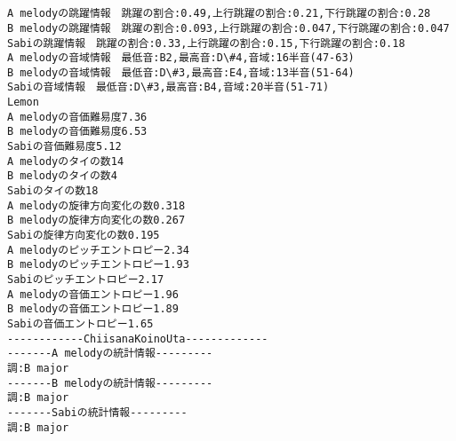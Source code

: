 \documentclass[11pt]{article}
\begin{document}
    \begin{center}
    \end{center}
    { \hspace*{\fill} \\}
    
    \begin{center}
    \end{center}
    { \hspace*{\fill} \\}
    
    \begin{Verbatim}[commandchars=\\\{\}]
A melodyの跳躍情報　跳躍の割合:0.49,上行跳躍の割合:0.21,下行跳躍の割合:0.28
B melodyの跳躍情報　跳躍の割合:0.093,上行跳躍の割合:0.047,下行跳躍の割合:0.047
Sabiの跳躍情報　跳躍の割合:0.33,上行跳躍の割合:0.15,下行跳躍の割合:0.18
A melodyの音域情報　最低音:B2,最高音:D\#4,音域:16半音(47-63)
B melodyの音域情報　最低音:D\#3,最高音:E4,音域:13半音(51-64)
Sabiの音域情報　最低音:D\#3,最高音:B4,音域:20半音(51-71)
Lemon
A melodyの音価難易度7.36
B melodyの音価難易度6.53
Sabiの音価難易度5.12
A melodyのタイの数14
B melodyのタイの数4
Sabiのタイの数18
A melodyの旋律方向変化の数0.318
B melodyの旋律方向変化の数0.267
Sabiの旋律方向変化の数0.195
A melodyのピッチエントロピー2.34
B melodyのピッチエントロピー1.93
Sabiのピッチエントロピー2.17
A melodyの音価エントロピー1.96
B melodyの音価エントロピー1.89
Sabiの音価エントロピー1.65
------------ChiisanaKoinoUta-------------
-------A melodyの統計情報---------
調:B major
-------B melodyの統計情報---------
調:B major
-------Sabiの統計情報---------
調:B major

    \end{Verbatim}

    \begin{center}
    \end{center}
    { \hspace*{\fill} \\}
    
    \begin{center}
    \end{center}
    { \hspace*{\fill} \\}
    
\end{document}
